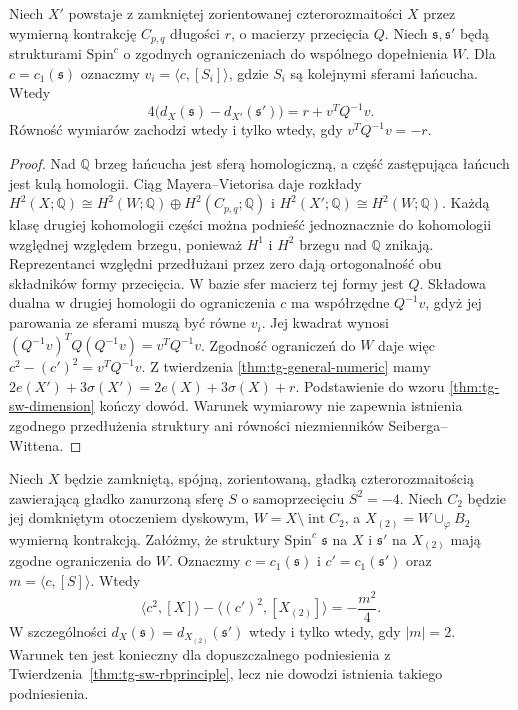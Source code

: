 \begin{stwierdzenie}
\label{prop:tg-sw-general-index-pairing}
Niech $X'$ powstaje z zamkniętej zorientowanej
czterorozmaitości $X$ przez wymierną kontrakcję
$C_{p,q}$ długości $r$, o macierzy przecięcia $Q$.
Niech $\mathfrak s,\mathfrak s'$ będą strukturami
$\mathrm{Spin}^c$ o zgodnych ograniczeniach do
wspólnego dopełnienia $W$. Dla $c=c_1(\mathfrak s)$
oznaczmy $v_i=\langle c,[S_i]\rangle$, gdzie $S_i$
są kolejnymi sferami łańcucha. Wtedy
\[
4\bigl(d_X(\mathfrak s)-d_{X'}(\mathfrak s')\bigr)
=r+v^TQ^{-1}v.
\]
Równość wymiarów zachodzi wtedy i tylko wtedy,
gdy $v^TQ^{-1}v=-r$.
\end{stwierdzenie}
\begin{proof}
Nad $\mathbb Q$ brzeg łańcucha jest sferą
homologiczną, a część zastępująca łańcuch jest kulą
homologii. Ciąg Mayera--Vietorisa daje rozkłady
$H^2(X;\mathbb Q)\cong H^2(W;\mathbb Q)\oplus
H^2(C_{p,q};\mathbb Q)$ i
$H^2(X';\mathbb Q)\cong H^2(W;\mathbb Q)$.
Każdą klasę drugiej kohomologii części można podnieść
jednoznacznie do kohomologii względnej względem brzegu,
ponieważ $H^1$ i $H^2$ brzegu nad $\mathbb Q$ znikają.
Reprezentanci względni przedłużani przez zero dają
ortogonalność obu składników formy przecięcia.
W bazie sfer macierz tej formy jest $Q$.
Składowa dualna w drugiej homologii do ograniczenia
$c$ ma współrzędne $Q^{-1}v$, gdyż jej parowania
ze sferami muszą być równe $v_i$.
Jej kwadrat wynosi
$(Q^{-1}v)^TQ(Q^{-1}v)=v^TQ^{-1}v$.
Zgodność ograniczeń do $W$ daje więc
$c^2-(c')^2=v^TQ^{-1}v$.
Z twierdzenia \ref{thm:tg-general-numeric} mamy
$2e(X')+3\sigma(X')=2e(X)+3\sigma(X)+r$.
Podstawienie do wzoru \ref{thm:tg-sw-dimension}
kończy dowód. Warunek wymiarowy nie zapewnia
istnienia zgodnego przedłużenia struktury ani
równości niezmienników Seiberga--Wittena.
\end{proof}

\begin{lemat}
\label{lem:tg-sw-c2-admissible-pairing}
Niech $X$ będzie zamkniętą, spójną, zorientowaną, gładką
czterorozmaitością zawierającą gładko zanurzoną sferę
$S$ o samoprzecięciu $S^2=-4$. Niech $C_2$ będzie jej
domkniętym otoczeniem dyskowym, $W=X\setminus
\operatorname{int}C_2$, a $X_{(2)}=W\cup_{\varphi}B_2$
wymierną kontrakcją. Załóżmy, że struktury
$\mathrm{Spin}^c$ $\mathfrak s$ na $X$ i $\mathfrak s'$
na $X_{(2)}$ mają zgodne ograniczenia do $W$.
Oznaczmy $c=c_1(\mathfrak s)$ i
$c'=c_1(\mathfrak s')$ oraz $m=\langle c,[S]\rangle$.
Wtedy
\[
\langle c^2,[X]\rangle-
\langle (c')^2,[X_{(2)}]\rangle=-\frac{m^2}{4}.
\]
W szczególności $d_X(\mathfrak s)=d_{X_{(2)}}(\mathfrak s')$
wtedy i tylko wtedy, gdy $|m|=2$.
Warunek ten jest konieczny dla dopuszczalnego
podniesienia z Twierdzenia~\ref{thm:tg-sw-rbprinciple},
lecz nie dowodzi istnienia takiego podniesienia.
\end{lemat}

